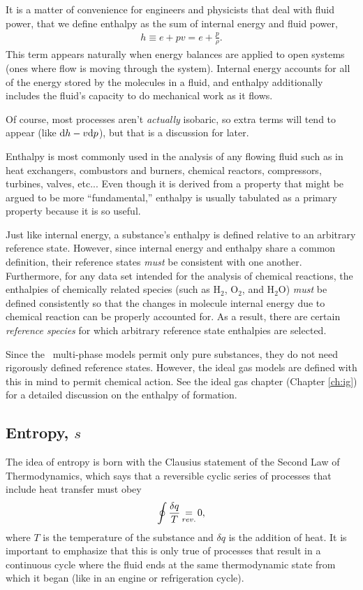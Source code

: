 It is a matter of convenience for engineers and physicists that deal with fluid power, that we define enthalpy as the sum of internal energy and fluid power,
\begin{align}
h \equiv e + pv = e + \frac{p}{\rho}.\label{eqn:intro:h}
\end{align}
This term appears naturally when energy balances are applied to open systems (ones where flow is moving through the system).  Internal energy accounts for all of the energy stored by the molecules in a fluid, and enthalpy additionally includes the fluid's capacity to do mechanical work as it flows.

Of course, most processes aren't \emph{actually} isobaric, so extra terms will tend to appear (like $\mathrm{d} h - v \mathrm{d} p$), but that is a discussion for later.

Enthalpy is most commonly used in the analysis of any flowing fluid such as in heat exchangers, combustors and burners, chemical reactors, compressors, turbines, valves, etc...  Even though it is derived from a property that might be argued to be more ``fundamental,'' enthalpy is usually tabulated as a primary property because it is so useful.

Just like internal energy, a substance's enthalpy is defined relative to an arbitrary reference state.  However, since internal energy and enthalpy share a common definition, their reference states \emph{must} be consistent with one another.  Furthermore, for any data set intended for the analysis of chemical reactions, the enthalpies of chemically related species (such as H$_2$, O$_2$, and H$_2$O) \emph{must} be defined consistently so that the changes in molecule internal energy due to chemical reaction can be properly accounted for.  As a result, there are certain \emph{reference species} for which arbitrary reference state enthalpies are selected.  

Since the \PM\ multi-phase models permit only pure substances, they do not need rigorously defined reference states.  However, the ideal gas models are defined with this in mind to permit chemical action.  See the ideal gas chapter (Chapter \ref{ch:ig}) for a detailed discussion on the enthalpy of formation.

\subsection{Entropy, $s$}\label{sec:intro:s}

The idea of entropy is born with the Clausius statement of the Second Law of Thermodynamics, which says that a reversible cyclic series of processes that include heat transfer must obey
\begin{align}
\oint \frac{\delta q}{T} \operatorname*{=}_{rev.} 0,
\end{align}
where $T$ is the temperature of the substance and $\delta q$ is the addition of heat.  It is important to emphasize that this is only true of processes that result in a continuous cycle where the fluid ends at the same thermodynamic state from which it began (like in an engine or refrigeration cycle).


